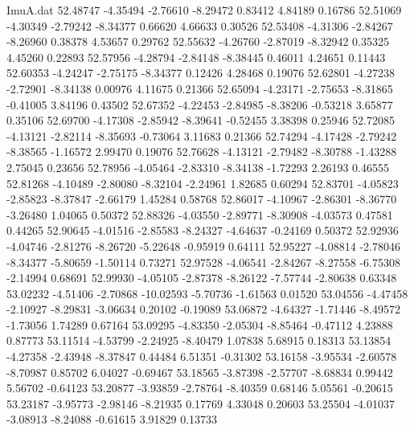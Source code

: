 \begin{filecontents}{ImuA.dat}
  52.48747   -4.35494   -2.76610   -8.29472    0.83412    4.84189    0.16786
  52.51069   -4.30349   -2.79242   -8.34377    0.66620    4.66633    0.30526
  52.53408   -4.31306   -2.84267   -8.26960    0.38378    4.53657    0.29762
  52.55632   -4.26760   -2.87019   -8.32942    0.35325    4.45260    0.22893
  52.57956   -4.28794   -2.84148   -8.38445    0.46011    4.24651    0.11443
  52.60353   -4.24247   -2.75175   -8.34377    0.12426    4.28468    0.19076
  52.62801   -4.27238   -2.72901   -8.34138    0.00976    4.11675    0.21366
  52.65094   -4.23171   -2.75653   -8.31865   -0.41005    3.84196    0.43502
  52.67352   -4.22453   -2.84985   -8.38206   -0.53218    3.65877    0.35106
  52.69700   -4.17308   -2.85942   -8.39641   -0.52455    3.38398    0.25946
  52.72085   -4.13121   -2.82114   -8.35693   -0.73064    3.11683    0.21366
  52.74294   -4.17428   -2.79242   -8.38565   -1.16572    2.99470    0.19076
  52.76628   -4.13121   -2.79482   -8.30788   -1.43288    2.75045    0.23656
  52.78956   -4.05464   -2.83310   -8.34138   -1.72293    2.26193    0.46555
  52.81268   -4.10489   -2.80080   -8.32104   -2.24961    1.82685    0.60294
  52.83701   -4.05823   -2.85823   -8.37847   -2.66179    1.45284    0.58768
  52.86017   -4.10967   -2.86301   -8.36770   -3.26480    1.04065    0.50372
  52.88326   -4.03550   -2.89771   -8.30908   -4.03573    0.47581    0.44265
  52.90645   -4.01516   -2.85583   -8.24327   -4.64637   -0.24169    0.50372
  52.92936   -4.04746   -2.81276   -8.26720   -5.22648   -0.95919    0.64111
  52.95227   -4.08814   -2.78046   -8.34377   -5.80659   -1.50114    0.73271
  52.97528   -4.06541   -2.84267   -8.27558   -6.75308   -2.14994    0.68691
  52.99930   -4.05105   -2.87378   -8.26122   -7.57744   -2.80638    0.63348
  53.02232   -4.51406   -2.70868  -10.02593   -5.70736   -1.61563    0.01520
  53.04556   -4.47458   -2.10927   -8.29831   -3.06634    0.20102   -0.19089
  53.06872   -4.64327   -1.71446   -8.49572   -1.73056    1.74289    0.67164
  53.09295   -4.83350   -2.05304   -8.85464   -0.47112    4.23888    0.87773
  53.11514   -4.53799   -2.24925   -8.40479    1.07838    5.68915    0.18313
  53.13854   -4.27358   -2.43948   -8.37847    0.44484    6.51351   -0.31302
  53.16158   -3.95534   -2.60578   -8.70987    0.85702    6.04027   -0.69467
  53.18565   -3.87398   -2.57707   -8.68834    0.99442    5.56702   -0.64123
  53.20877   -3.93859   -2.78764   -8.40359    0.68146    5.05561   -0.20615
  53.23187   -3.95773   -2.98146   -8.21935    0.17769    4.33048    0.20603
  53.25504   -4.01037   -3.08913   -8.24088   -0.61615    3.91829    0.13733

\end{filecontents}
